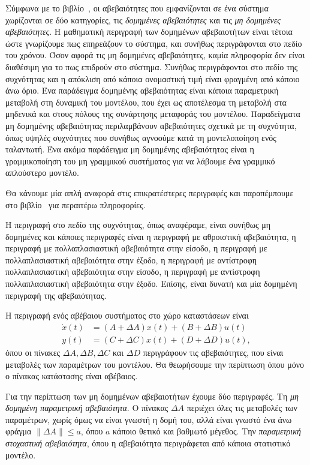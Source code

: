 Σύμφωνα με το βιβλίο~\cite{kosmidou2009robust}, οι αβεβαιότητες που εμφανίζονται
σε ένα σύστημα χωρίζονται σε δύο κατηγορίες, τις \emph{δομημένες αβεβαιότητες}
και τις \emph{μη δομημένες αβεβαιότητες}. Η μαθηματική περιγραφή των δομημένων
αβεβαιοτήτων είναι τέτοια ώστε γνωρίζουμε πως επηρεάζουν το σύστημα, και
συνήθως περιγράφονται στο πεδίο του χρόνου. Όσον αφορά τις μη δομημένες
αβεβαιότητες, καμία πληροφορία δεν είναι διαθέσιμη για το πως επιδρούν στο
σύστημα. Συνήθως περιγράφονται στο πεδίο της συχνότητας και η απόκλιση από
κάποια ονομαστική τιμή είναι φραγμένη από κάποιο άνω όριο. Ένα παράδειγμα δομημένης
αβεβαιότητας είναι κάποια παραμετρική μεταβολή στη δυναμική του μοντέλου, που
έχει ως αποτέλεσμα τη μεταβολή στα μηδενικά και στους πόλους της συνάρτησης μεταφοράς
του μοντέλου.  Παραδείγματα μη δομημένης αβεβαιότητας περιλαμβάνουν αβεβαιότητες
σχετικά με τη συχνότητα, όπως υψηλές συχνότητες που συνήθως αγνοούμε κατά τη
μοντελοποίηση ενός ταλαντωτή. Ένα ακόμα παράδειγμα μη δομημένης αβεβαιότητας είναι
η γραμμικοποίηση του μη γραμμικού συστήματος για να λάβουμε ένα γραμμικό απλούστερο μοντέλο.

Θα κάνουμε μία απλή αναφορά στις επικρατέστερες περιγραφές και
παραπέμπουμε στο βιβλίο~\cite{kosmidou2009robust} για περαιτέρω πληροφορίες.

Η περιγραφή στο πεδίο της συχνότητας, όπως αναφέραμε, είναι συνήθως μη
δομημένες και κάποιες περιγραφές είναι η περιγραφή με αθροιστική αβεβαιότητα,
η περιγραφή με πολλαπλασιαστική αβεβαιότητα στην είσοδο, η περιγραφή με
πολλαπλασιαστική αβεβαιότητα στην έξοδο, η περιγραφή με αντίστροφη πολλαπλασιαστική
αβεβαιότητα στην είσοδο, η περιγραφή με αντίστροφη πολλαπλασιαστική αβεβαιότητα
στην έξοδο. Επίσης, είναι δυνατή και μία δομημένη περιγραφή της αβεβαιότητας.

Η περιγραφή ενός αβέβαιου συστήματος στο χώρο καταστάσεων είναι
\begin{align*}
    \dot{x}(t) &= (A + \Delta A)x(t) + (B + \Delta B)u(t) \\
    y(t) &= (C + \Delta C)x(t) + (D + \Delta D)u(t),
\end{align*}
όπου οι πίνακες \( \Delta A, \Delta B, \Delta C \) και \( \Delta D \)
περιγράφουν τις αβεβαιότητες, που είναι μεταβολές των παραμέτρων του μοντέλου.
Θα θεωρήσουμε την περίπτωση όπου μόνο ο πίνακας κατάστασης είναι αβέβαιος.

Για την περίπτωση των μη δομημένων αβεβαιοτήτων έχουμε δύο περιγραφές. Τη
\emph{μη δομημένη παραμετρική αβεβαιότητα}. Ο πίνακας \( \Delta A \) περιέχει όλες τις
μεταβολές των παραμέτρων, χωρίς όμως να είναι γνωστή η δομή του, αλλά είναι
γνωστό ένα άνω φράγμα \( \|\Delta A\| \leq a \), όπου \( a \) κάποιο θετικό και
βαθμωτό μέγεθος. Την \emph{παραμετρική στοχαστική αβεβαιότητα}, όπου η αβεβαιότητα περιγράφεται
από κάποια στατιστικό μοντέλο.

